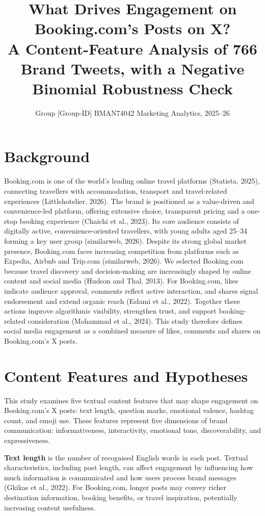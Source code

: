 \documentclass[12pt,a4paper]{article}
\title{What Drives Engagement on Booking.com's Posts on X?\\[0.3em]
\large A Content-Feature Analysis of 766 Brand Tweets, with a Negative Binomial Robustness Check}
\author{Group [Group-ID] \quad BMAN74042 Marketing Analytics, 2025--26}
\date{}
\begin{document}
\maketitle

\section{Background}

Booking.com is one of the world's leading online travel platforms (Statista, 2025), connecting travellers with accommodation, transport and travel-related experiences (Littlehotelier, 2026). The brand is positioned as a value-driven and convenience-led platform, offering extensive choice, transparent pricing and a one-stop booking experience (Chaichi et al., 2023). Its core audience consists of digitally active, convenience-oriented travellers, with young adults aged 25--34 forming a key user group (similarweb, 2026). Despite its strong global market presence, Booking.com faces increasing competition from platforms such as Expedia, Airbnb and Trip.com (similarweb, 2026). We selected Booking.com because travel discovery and decision-making are increasingly shaped by online content and social media (Hudson and Thal, 2013). For Booking.com, likes indicate audience approval, comments reflect active interaction, and shares signal endorsement and extend organic reach (Eslami et al., 2022). Together these actions improve algorithmic visibility, strengthen trust, and support booking-related consideration (Mohammad et al., 2024). This study therefore defines social media engagement as a combined measure of likes, comments and shares on Booking.com's X posts.

\section{Content Features and Hypotheses}

This study examines five textual content features that may shape engagement on Booking.com's X posts: text length, question marks, emotional valence, hashtag count, and emoji use. These features represent five dimensions of brand communication: informativeness, interactivity, emotional tone, discoverability, and expressiveness.

\textbf{Text length} is the number of recognised English words in each post. Textual characteristics, including post length, can affect engagement by influencing how much information is communicated and how users process brand messages (Gkikas et al., 2022). For Booking.com, longer posts may convey richer destination information, booking benefits, or travel inspiration, potentially increasing content usefulness.
\end{document}
